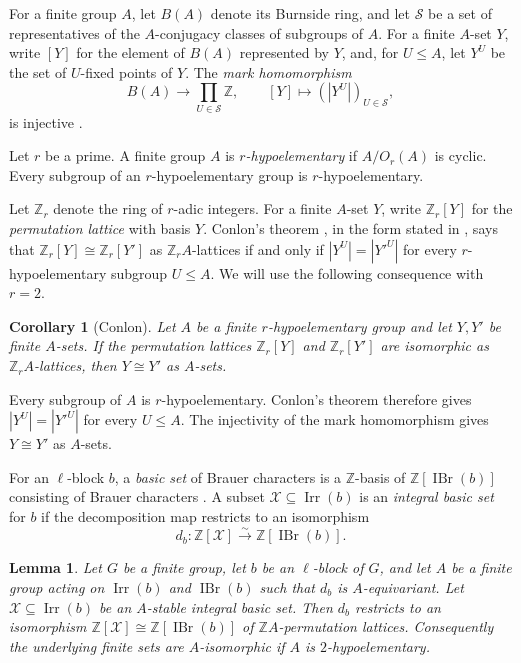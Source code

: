 \documentclass[10pt]{amsart}
\newtheorem{lemma}[theorem]{Lemma}
\newtheorem{corollary}[theorem]{Corollary}
\theoremstyle{definition}
\renewcommand{\leq}{\leqslant}
\let\oldendproof\endproof
\renewenvironment{proof}[1][\proofname]{%
  \oldproof[\bfseries #1]%
}{\oldendproof}
\DeclareMathOperator{\IBr}{IBr}
\DeclareMathOperator{\Irr}{Irr}
\newcommand{\Z}{\mathbb Z}
\numberwithin{equation}{section}
\numberwithin{table}{section}
\begin{document}
For a finite group $A$, let $B(A)$ denote its Burnside ring, and let
$\mathcal S$ be a set of representatives of the $A$-conjugacy classes of
subgroups of $A$.  For a finite $A$-set $Y$, write $[Y]$ for the element of $B(A)$
represented by $Y$, and, for $U\leq A$, let $Y^U$ be the set of $U$-fixed points of
$Y$.  The \emph{mark homomorphism}
\[
        B(A)\longrightarrow \prod_{U\in\mathcal S}\Z,\qquad
        [Y]\longmapsto (|Y^U|)_{U\in\mathcal S},
\]
is injective
\cite[Theorem~2.3.2 and Section~3.2]{Bouc2000}.

Let $r$ be a prime. A finite group $A$ is
\emph{$r$-hypoelementary} if $A/O_r(A)$ is cyclic.
Every subgroup of an $r$-hypoelementary group is $r$-hypoelementary.

Let $\Z_r$ denote the ring of $r$-adic integers. For a finite $A$-set
$Y$, write $\Z_r[Y]$ for the \emph{permutation lattice} with basis $Y$.
Conlon's theorem
\cite{Conlon1968}, in the form stated in
\cite[Theorem~3.5.5]{Bouc2000}, says that
$\Z_r[Y]\cong\Z_r[Y']$ as $\Z_rA$-lattices if and only if
$|Y^U|=|Y'^U|$ for every $r$-hypoelementary subgroup $U\leq A$.
We will use the following consequence with $r=2$.

\begin{corollary}[Conlon]\label{cor:conlon-mark}
Let $A$ be a finite $r$-hypoelementary group and let $Y,Y'$ be finite
$A$-sets.  If the permutation lattices
$\Z_r[Y]$ and $\Z_r[Y']$ are isomorphic as $\Z_rA$-lattices, then
$Y\cong Y'$ as $A$-sets.
\end{corollary}

\begin{proof}
Every subgroup of $A$ is $r$-hypoelementary. Conlon's theorem therefore
gives $|Y^U|=|Y'^U|$ for every $U\leq A$. The injectivity of the mark
homomorphism gives $Y\cong Y'$ as $A$-sets.
\end{proof}

For an $\ell$-block $b$, a \emph{basic set} of Brauer characters is a
$\Z$-basis of $\Z[\IBr(b)]$ consisting of Brauer characters
\cite[(1.1)--(1.2)]{GeckHiss1991}.
A subset $\mathcal X\subseteq\Irr(b)$ is an \emph{integral basic set}
for $b$ if the decomposition map restricts to an isomorphism
\[
  d_b:\Z[\mathcal X]\xrightarrow{\sim}\Z[\IBr(b)].
\]

\begin{lemma}\label{lem:basicset-bridge}
Let $G$ be a finite group, let $b$ be an $\ell$-block of $G$, and let $A$ be
a finite group acting on $\Irr(b)$ and $\IBr(b)$ such that $d_b$ is
$A$-equivariant.  Let $\mathcal X\subseteq\Irr(b)$ be an $A$-stable integral
basic set.  Then $d_b$ restricts to an isomorphism
$\Z[\mathcal X]\cong\Z[\IBr(b)]$ of $\Z A$-permutation lattices.
Consequently the underlying finite sets are $A$-isomorphic if $A$ is
$2$-hypoelementary.
\end{lemma}
\end{document}
